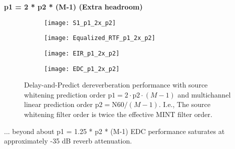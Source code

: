 \textbf{p1 = 2 * p2  * (M-1) (Extra headroom)}

\begin{figure}[H]
	\centering
	\begin{subfigure}[b]{0.49\textwidth}
		\centering
		\texttt{[image: S1\_p1\_2x\_p2]}
	\end{subfigure}
	\hfill
	\begin{subfigure}[b]{0.49\textwidth}
		\centering
		\texttt{[image: Equalized\_RTF\_p1\_2x\_p2]}
	\end{subfigure}
	\hfill
	\begin{subfigure}[b]{0.49\textwidth}
		\centering
		\texttt{[image: EIR\_p1\_2x\_p2]}
	\end{subfigure}
	\hfill
	\begin{subfigure}[b]{0.49\textwidth}
		\centering
		\texttt{[image: EDC\_p1\_2x\_p2]}
	\end{subfigure}
	\hfill
	\caption{Delay-and-Predict dereverberation performance with source whitening prediction order $\mathrm{p1} = 2 \cdot \mathrm{p2} \cdot (M-1)$ and multichannel linear prediction order $\mathrm{p2} = \mathrm{N60} / (M-1)$. I.e., The source whitening filter order is twice the effective MINT filter order.}
	\label{fig:params_p1_2x_p2}
\end{figure}

... beyond about p1 = 1.25 * p2 * (M-1) EDC performance saturates at approximately -35 dB reverb attenuation.

